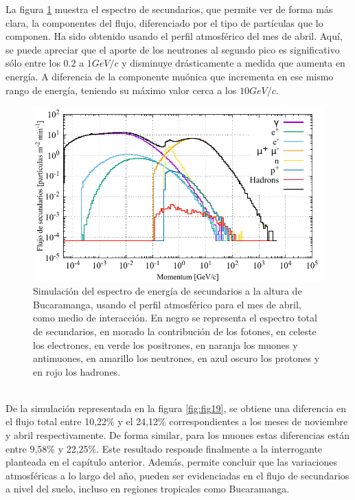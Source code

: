 La figura \ref{fig:fig20} muestra el espectro de secundarios, que permite ver de forma más clara, la componentes del flujo, diferenciado por el tipo de partículas que lo componen. Ha sido obtenido usando el perfil atmosférico del mes de abril. Aquí, se puede apreciar que el aporte de los neutrones al segundo pico es significativo sólo entre los $0.2$ a $1 GeV/c$ y disminuye drásticamente a medida que aumenta en energía. A diferencia de la componente muónica que incrementa en ese mismo rango de energía, teniendo su máximo valor cerca a los $10 GeV/c$.\\
\begin{figure}[htb!]
\centering
\includegraphics[width=1\textwidth]{Figs/flux_bucaramanga_ALL_PARTICLES_1212.pdf}
\caption[Espectro de energía de secundarios a la altura de Bucaramanga]{Simulación del espectro de energía de secundarios a la altura de Bucaramanga, usando el perfil atmosférico para el mes de abril, como medio de interacción. En negro se representa el espectro total de secundarios, en morado la contribución de los fotones, en celeste los electrones, en verde los positrones, en naranja los muones y antimuones, en amarillo los neutrones, en azul oscuro los protones y en rojo los hadrones.}
\label{fig:fig20}
\end{figure}\\
De la simulación representada en la figura \ref{fig:fig19}, se obtiene una diferencia en el flujo total entre 10,22$\%$ y el 24,12$\%$ correspondientes a los meses de noviembre y abril respectivamente. De forma similar, para los muones estas diferencias están entre 9,58$\%$ y 22,25$\%$. Este resultado responde finalmente a la interrogante planteada en el capítulo anterior. Además, permite concluir que las variaciones atmosféricas a lo largo del año, pueden ser evidenciadas en el flujo de secundarios a nivel del suelo, incluso en regiones tropicales como Bucaramanga.\\

